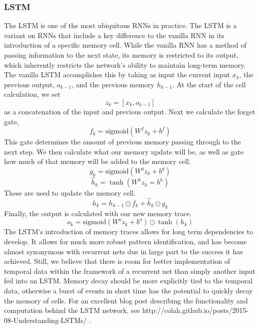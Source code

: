 \subsubsection{LSTM}
The LSTM is one of the most ubiquitous RNNs in practice. The LSTM is a variant on RNNs that include a key difference to the vanilla RNN in its introduction of a specific memory cell. While the vanilla RNN has a method of passing information to the next state, its memory is restricted to its output, which inherently restricts the network's ability to maintain long-term memory. The vanilla LSTM accomplishes this by taking as input the current input $x_k$, the previous output, $o_{k-1}$, and the previous memory $h_{k-1}$. At the start of the cell calculation, we set \[z_k = [x_k,o_{k-1}]\] as a concatenation of the input and previous output. Next we calculate the forget gate,\[f_k = \text{sigmoid}(W^f z_k + b^f)\]This gate determines the amount of previous memory passing through to the next step. We then calculate what our memory update will be, as well as gate how much of that memory will be added to the memory cell.
\[g_k = \text{sigmoid}(W^g z_k + b^g)\]
\[ \hat{h}_k = \tanh(W^h z_k =b^h)\]
These are used to update the memory cell.
\[ h_k =  h_{k-1} \odot f_k + \hat{h}_k \odot g_k\]
Finally, the output is calculated with our new memory trace.
\[o_k = \text{sigmoid}(W^oz_k + b^o) \odot \tanh(h_k)\]
The LSTM's introduction of memory traces allows for long term dependencies to develop. It allows for much more robust pattern identification, and has become almost synonymous with recurrent nets due in large part to the success it has achieved. Still, we believe that there is room for better implementation of temporal data within the framework of a recurrent net than simply another input fed into an LSTM. Memory decay should be more explicitly tied to the temporal data, otherwise a burst of events in short time has the potential to quickly decay the memory of cells. For an excellent blog post describing the functionality and computation behind the LSTM network, see http://colah.github.io/posts/2015-08-Understanding-LSTMs/ \cite{LSTM-Blog}.